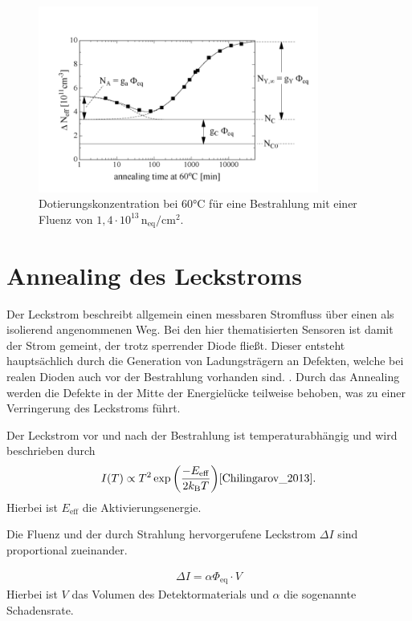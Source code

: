 \begin{figure}
  \centering
  \includegraphics[width=0.82\textwidth]{logos/n_eff_beispiel.PNG}
  \caption{Dotierungskonzentration bei 60°C für eine Bestrahlung mit einer Fluenz von
  $1,4\cdot 10^{13} \, \mathrm{n_{eq}/cm^2}$.\cite{moll}}
  \label{fig:n_eff_beispiel}
\end{figure}



\section{Annealing des Leckstroms}
Der Leckstrom beschreibt allgemein einen messbaren Stromfluss über einen als isolierend
angenommenen Weg. Bei den hier thematisierten Sensoren ist damit der Strom gemeint, der trotz sperrender
Diode fließt. Dieser entsteht hauptsächlich durch die Generation von Ladungsträgern an Defekten, welche
bei realen Dioden auch vor der Bestrahlung vorhanden sind. \cite{moll}.
Durch das Annealing werden die Defekte in der Mitte der Energielücke teilweise behoben,
was zu einer Verringerung des Leckstroms führt.

Der Leckstrom vor und nach der Bestrahlung ist temperaturabhängig und wird
beschrieben durch
\begin{align}
  I(T) \propto T^2 \exp{\left(\frac{-E_{\mathrm{eff}}}{2 k_{\mathrm{B}}T}\right)} \text{\cite{Chilingarov_2013}} \label{eqn:Chilingarov_2013}.
\end{align}
Hierbei ist $E_{\mathrm{eff}}$ die Aktivierungsenergie.

Die Fluenz und der durch Strahlung hervorgerufene Leckstrom $\Delta I$ sind
proportional zueinander.


\begin{align}
  \Delta I = \alpha \Phi_{\mathrm{eq}} \cdot V
\end{align}
Hierbei ist $V$ das Volumen des Detektormaterials und $\alpha$ die
sogenannte Schadensrate.




